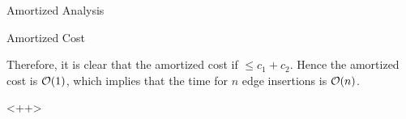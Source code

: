 \documentclass{article}
\begin{document}
\begin{question}
\begin{qsection}{Amortized Analysis}
\begin{qsubsection}{Amortized Cost}
			 \br%


			Therefore, it is clear that the amortized cost if $\le c_1 + c_2$. Hence the amortized cost is $\mathcal{O}(1)$, which implies that the time for $n$ edge insertions is $\mathcal{O}(n)$.

		\end{qsubsection}

	\end{qsection}

\end{question}

\begin{question}

	

\end{question}<++>
\end{document}
